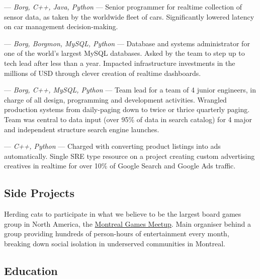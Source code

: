 \begin{langen}
\begin{description}%
\vspace{2 mm}
\item[Street View] --- \textit{Borg, C++, Java, Python} --- Senior programmer for realtime collection of sensor data, as taken by the worldwide fleet of cars. Significantly lowered latency on car management decision-making.
\item[Ads-SRE-DB] --- \textit{Borg, Borgmon, MySQL, Python} --- Database and systems administrator for one of the world's largest MySQL databases. Asked by the team to step up to tech lead after less than a year. Impacted infrastructure investments in the millions of USD through clever creation of realtime dashboards.
\item [Froogle \& Google Base] --- \textit{Borg, C++, MySQL, Python} --- Team lead for a team of 4 junior engineers, in charge of all design, programming and development activities. Wrangled production systems from daily-paging down to twice or thrice quarterly paging. Team was central to data input (over 95\% of data in search catalog) for 4 major and independent structure search engine launches.
\item[Ads/Deli] --- \textit{C++, Python} --- Charged with converting product listings into ads automatically. Single SRE type resource on a project creating custom advertising creatives in realtime for over 10\% of Google Search and Google Ads traffic.
\end{description}
\end{langen}

\begin{langen}
\section{Side Projects}
\end{langen}

\begin{langen}
  Herding cats to participate in what we believe to be the largest board games group in North America, the \href{https://www.meetup.com/montreal-games-meetup/}{Montreal Games Meetup}. Main organiser behind a group providing hundreds of person-hours of entertainment every month, breaking down social isolation in underserved communities in Montreal.
\end{langen}

\begin{langen}
\section{Education}
\end{langen}

\begin{langen}
\end{langen}
